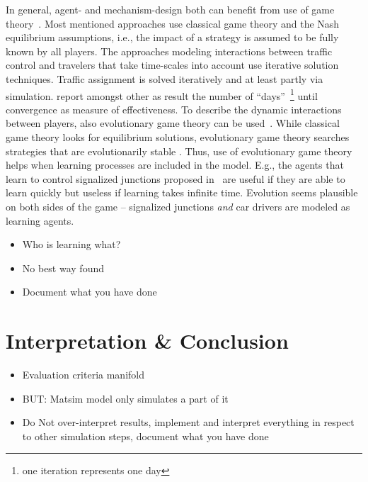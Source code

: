 
In general, agent- and mechanism-design both can benefit from use of game theory~\citep[][pp.~666]{RusselNorvig2010ArtificialIntelligence}. 
Most mentioned approaches use classical game theory and the Nash equilibrium assumptions, i.e., the impact of a strategy is assumed to be fully known by all players. 
The approaches modeling interactions between traffic control and travelers that take time-scales into account use iterative solution techniques. 
Traffic assignment is solved iteratively and at least partly via simulation. 
\citet{Hu1997D2DFlowEvolutionReactiveSignalsDynasmart} report amongst other as result the number of ``days''~\footnote{one iteration represents one day} until convergence as measure of effectiveness. 
To describe the dynamic interactions between players, also evolutionary game theory can be used~\citep[e.g.~][]{HofbSigmBook}. 
While classical game theory looks for equilibrium solutions, evolutionary game theory searches strategies that are evolutionarily stable \citep[p.~348]{Bazzan2009ReinforcementLearningPrint}. 
Thus, use of evolutionary game theory helps when learning processes are included in the model. 
E.g., the agents that learn to control signalized junctions proposed in~\citet{Bazzan2005signalAgents} are useful if they are able to learn quickly but useless if learning takes infinite time. 
Evolution seems plausible on both sides of the game -- \citet[e.g.~][]{BazzanEtc2008co-evolution-of-tr-lights-lncs} signalized junctions \emph{and} car drivers are modeled as learning agents. 

\begin{itemize}
	\item Who is learning what? 
	\item No best way found
	\item Document what you have done
\end{itemize}

\section{Interpretation \& Conclusion}
\label{sec:signals_evaluation_conclusion}

\begin{itemize}
	\item Evaluation criteria manifold
	\item BUT: Matsim model only simulates a part of it
	\item Do Not over-interpret results, implement and interpret everything in respect to other simulation steps, document what you have done
\end{itemize}

